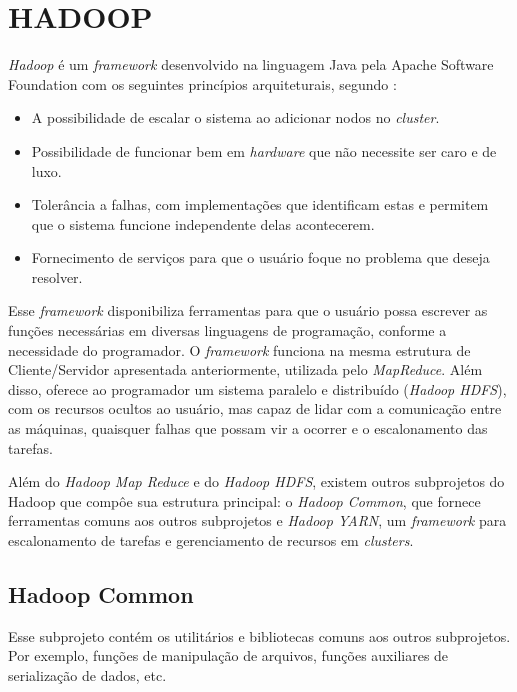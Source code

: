 
\section{HADOOP} \label{sec:hadoop}

\textit{Hadoop} é um \textit{framework} desenvolvido na linguagem Java pela Apache Software Foundation com os seguintes princípios arquiteturais, segundo \textcite{ImprovingNavarro18}:
\begin{itemize}
  \item A possibilidade de escalar o sistema ao adicionar nodos no \textit{cluster}.
  \item Possibilidade de funcionar bem em \textit{hardware} que não necessite ser caro e de luxo.
  \item Tolerância a falhas, com implementações que identificam estas e permitem que o sistema funcione independente delas acontecerem.
  \item Fornecimento de serviços para que o usuário foque no problema que deseja resolver.
\end{itemize}

Esse \textit{framework} disponibiliza ferramentas para que o usuário possa escrever as funções necessárias em diversas linguagens de programação, conforme a necessidade do programador. O \textit{framework} funciona na mesma estrutura de Cliente/Servidor apresentada anteriormente, utilizada pelo \textit{MapReduce}. Além disso, oferece ao programador um sistema paralelo e distribuído (\textit{Hadoop HDFS}), com os recursos ocultos ao usuário, mas capaz de lidar com a comunicação entre as máquinas, quaisquer falhas que possam vir a ocorrer e o escalonamento das tarefas.

Além do \textit{Hadoop Map Reduce} e do \textit{Hadoop HDFS}, existem outros subprojetos do Hadoop que compôe sua estrutura principal: o \textit{Hadoop Common}, que fornece ferramentas comuns aos outros subprojetos e \textit{Hadoop YARN}, um \textit{framework} para escalonamento de tarefas e gerenciamento de recursos em \textit{clusters}.

\subsection{Hadoop Common}\label{ssec:hadoopcommon}

Esse subprojeto contém os utilitários e bibliotecas comuns aos outros subprojetos. Por exemplo, funções de manipulação de arquivos, funções auxiliares de serialização de dados, etc.

